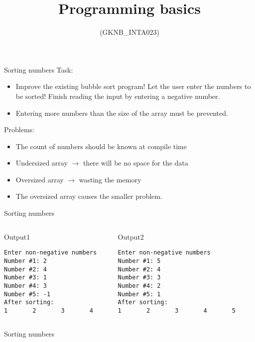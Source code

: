\documentclass[usenames,dvipsnames,aspectratio=169]{beamer}
\title[Lecture 9.]{Programming basics}
\subtitle{(GKNB\_INTA023)}
\begin{document}
\begin{frame}[plain]
  \titlepage
\end{frame}

\begin{frame}{Sorting numbers}
  Task:
  \begin{itemize}
    \item Improve the existing bubble sort program! Let the user enter the numbers to be sorted! Finish reading the input by entering a negative number.
    \item Entering more numbers than the size of the array must be prevented.
  \end{itemize}
  Problems:
  \begin{itemize}
    \item The count of numbers should be known at compile time
    \item Undersized array $\to$ there will be no space for the data
    \item Oversized array $\to$ wasting the memory
    \item The oversized array causes the smaller problem.
  \end{itemize}
\end{frame}

\begin{frame}[fragile]{Sorting numbers}
  \begin{columns}[T]
      \begin{block}{Output1}
        \small
        \begin{verbatim}
Enter non-negative numbers
Number #1: 2
Number #2: 4
Number #3: 1
Number #4: 3
Number #5: -1
After sorting:
1       2       3       4    
\end{verbatim}
      \end{block}
      \begin{block}{Output2}
        \small
        \begin{verbatim}
Enter non-negative numbers
Number #1: 5
Number #2: 4
Number #3: 3
Number #4: 2
Number #5: 1
After sorting:
1       2       3       4       5    
\end{verbatim}
      \end{block}
  \end{columns}
\end{frame}

\begin{frame}{Sorting numbers}
  \begin{exampleblock}{}
    
    
  \end{exampleblock}
\end{frame}
\end{document}
